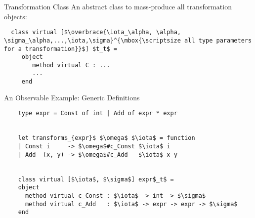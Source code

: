 \documentclass{beamer}
\theoremstyle{definition}
\theoremstyle{plain} %
\begin{document}
\begin{frame}[fragile]{Transformation Class}
An abstract class to mass-produce all transformation objects:
\vskip1cm

\begin{lstlisting}
  class virtual [$\overbrace{\iota_\alpha, \alpha, \sigma_\alpha,...,\iota,\sigma}^{\mbox{\scriptsize all type parameters for a transformation}}$] $t_t$ =
     object
        method virtual C : ...
        ...
     end     
\end{lstlisting}

\end{frame}


\begin{comment}
  We consider a small observable example right away. For the shown simple type with two constructors the framework
  automatically generates the following transformation function and the following transformation class. As the type
  is non-polymorphic, the signature of the class is rather simple: it parameterized only by the types of
  inherited and synthezised attributes. The signatures of two methods are rather obvious. 
\end{comment}

\begin{frame}[fragile]{An Observable Example: Generic Definitions}
  \begin{lstlisting}
    type expr = Const of int | Add of expr * expr

    
    let transform$_{expr}$ $\omega$ $\iota$ = function
    | Const i     -> $\omega$#c_Const $\iota$ i
    | Add  (x, y) -> $\omega$#c_Add   $\iota$ x y

    
    class virtual [$\iota$, $\sigma$] expr$_t$ =
    object
      method virtual c_Const : $\iota$ -> int -> $\sigma$
      method virtual c_Add   : $\iota$ -> expr -> expr -> $\sigma$
    end    
  \end{lstlisting}
\end{frame}


\begin{comment}
  Departing from those abstract generic definitions, a concrete transformation~--- show~--- can be implemented.
  First, we need a transformation object. For this we derive a concrete transformation class (we could
  construct an immediate object equally). Note, this class is parameterized with an additional argument~--- a
  function to transform the very same type we deal with. This function is used to implement recursion, and
  we need a fixpoint operator to tie the knot. Note, the type of class \lstinline|expr$_{show}$|  is not
  polymorphic any more; it instantiates all the parameters of the base class into ground types. Note also that
  we reused the generic transformation function~--- there is no pattern matching in the implemetation.
\end{comment}
\end{document}
